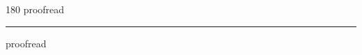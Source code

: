 
\begin{frame}
\begin{center}
\begin{turn}{180}
{\fontsize{2.5cm}{1em}\selectfont proofread}
\end{turn}
\vspace{1em}\par  
\hrule
\vspace{1em}\par  
{\fontsize{2.5cm}{1em}\selectfont proofread}
\end{center}
\end{frame}
